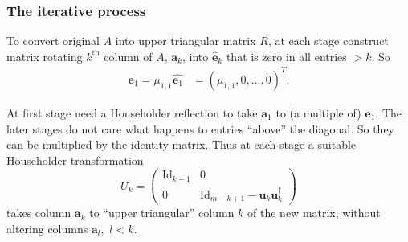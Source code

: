 \documentclass{beamer}
\newcommand{\bfm}[1]{{\boldsymbol{#1}}}
\begin{document}
\begin{frame}
  \frametitle{The iterative process}

  To convert original $A$ into upper triangular matrix $R$, at each
  stage construct matrix rotating $k^{\text{th}}$ column of $A$,
  $\bfm{a}_k$, into $\hat{\bfm{e}}_k$ that is zero in all entries
  $>k$. \pause So
  \begin{align*}
    \bfm{e}_1 = \mu_{1,1} \hat{\bfm{e}_1} & = (\mu_{1,1}, 0, \dots, 0)^T. %
  \end{align*}
  \pause

  At first stage need a Householder reflection to take $\bfm{a}_1$ to
  (a multiple of) $\bfm{e}_1$. The later stages do not care what
  happens to entries ``above'' the diagonal. So they can be multiplied
  by the identity matrix. \pause Thus at each stage a suitable
  Householder transformation
  \begin{equation*}
    U_k =
    \begin{pmatrix}
      \text{Id}_{k-1} & 0 \\
      0 & \text{Id}_{m-k+1} - \bfm{u}_k \bfm{u}_k^{\dagger}
    \end{pmatrix}
  \end{equation*}
  takes column $\bfm{a}_k$ to ``upper triangular'' column $k$ of the
  new matrix, without altering columns $\bfm{a}_l, \,\, l<k$.

\end{frame}
\end{document}
